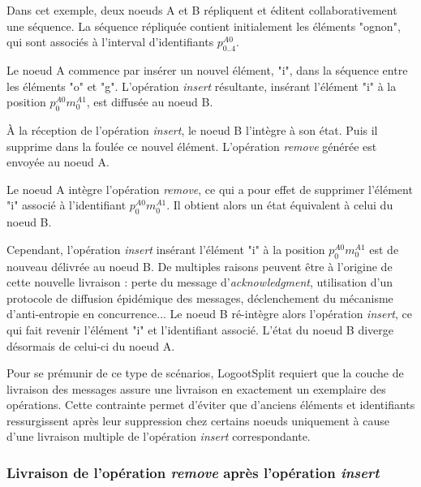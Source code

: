 \documentclass[12pt]{thesul}
\newcommand{\trm}[1]{\mathit{#1}}
\newcommand{\id}[3]{$\trm{#1}^{\trm{#2}}_{\trm{#3}}$}
\begin{document}
Dans cet exemple, deux noeuds A et B répliquent et éditent collaborativement une séquence.
La séquence répliquée contient initialement les éléments "ognon", qui sont associés à l'interval d'identifiants \id{p}{A0}{0..4}.

Le noeud A commence par insérer un nouvel élément, "i", dans la séquence entre les éléments "o" et "g".
L'opération \emph{insert} résultante, insérant l'élément "i" à la position \id{p}{A0}{0}\id{m}{A1}{0}, est diffusée au noeud B.

À la réception de l'opération \emph{insert}, le noeud B l'intègre à son état.
Puis il supprime dans la foulée ce nouvel élément.
L'opération \emph{remove} générée est envoyée au noeud A.

Le noeud A intègre l'opération \emph{remove}, ce qui a pour effet de supprimer l'élément "i" associé à l'identifiant \id{p}{A0}{0}\id{m}{A1}{0}.
Il obtient alors un état équivalent à celui du noeud B.

Cependant, l'opération \emph{insert} insérant l'élément "i" à la position \id{p}{A0}{0}\id{m}{A1}{0} est de nouveau délivrée au noeud B.
De multiples raisons peuvent être à l'origine de cette nouvelle livraison : perte du message d'\emph{acknowledgment}, utilisation d'un protocole de diffusion épidémique des messages, déclenchement du mécanisme d'anti-entropie en concurrence...
Le noeud B ré-intègre alors l'opération \emph{insert}, ce qui fait revenir l'élément "i" et l'identifiant associé.
L'état du noeud B diverge désormais de celui-ci du noeud A.

Pour se prémunir de ce type de scénarios, LogootSplit requiert que la couche de livraison des messages assure une livraison en exactement un exemplaire des opérations.
Cette contrainte permet d'éviter que d'anciens éléments et identifiants ressurgissent après leur suppression chez certains noeuds uniquement à cause d'une livraison multiple de l'opération \emph{insert} correspondante.


\subsubsection{Livraison de l'opération \emph{remove} après l'opération \emph{insert}}
\end{document}
